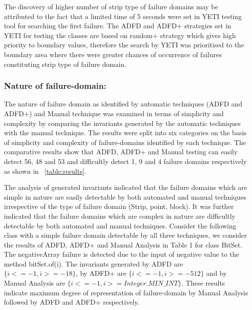 The discovery of higher number of strip type of failure domains may be attributed to the fact that a limited time of 5 seconds were set in YETI testing tool for searching the first failure. The ADFD and ADFD+ strategies set in YETI for testing the classes are based on random+ strategy which gives high priority to boundary values, therefore the search by YETI was prioritised to the boundary area where there were greater chances of occurrence of failures constituting strip type of failure domain.


\subsubsection{Nature of failure-domain:}
The nature of failure domain as identified by automatic techniques (ADFD and ADFD+) and Manual technique was examined in terms of simplicity and complexity by comparing the invariants generated by the automatic techniques with the manual technique. The results were split into six categories on the basis of simplicity and complexity of failure-domains identified by each technique. The comparative results show that ADFD, ADFD+ and Manual testing can easily detect 56, 48 and 53 and difficultly detect 1, 9 and 4 failure domains respectively as shown in ~\ref{table:results}.

The analysis of generated invariants indicated that the failure domains which are simple in nature are easily detectable by both automated and manual techniques irrespective of the type of failure domain (Strip, point, block). It was further indicated that the failure domains which are complex in nature are difficultly detectable by both automated and manual techniques. %
Consider the following class with a simple failure domain detectable by all three techniques, we consider the results of ADFD, ADFD+ and Manual Analysis in Table 1 for class BitSet. The negativeArray failure is detected due to the input of negative value to the method bitSet.of(i). The invariants generated by ADFD are $\{i <= -1, i >= -18\}$, by ADFD+ are $\{i <= -1, i >= -512\}$ and by Manual Analysis are $\{i <= -1, i >= Integer.MIN\_INT\}$. These results indicate maximum degree of representation of failure-domain by Manual Analysis followed by ADFD and ADFD+ respectively.

